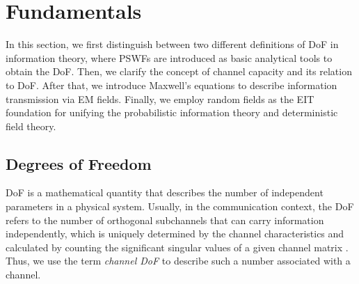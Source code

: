 \documentclass[journal,twocolumn]{IEEEtran}
\begin{document}
\section{Fundamentals}
In this section, we first distinguish between two different definitions of DoF in information theory, where PSWFs are introduced as basic analytical tools to obtain the DoF. 
Then, we clarify the concept of channel capacity and its relation to DoF. 
After that, we introduce Maxwell's equations to describe information transmission via EM fields. 
Finally, we employ random fields as the EIT foundation for unifying the probabilistic information theory and deterministic field theory. 


\subsection{Degrees of Freedom}
\label{Sec_2_Subsec_1}
DoF is a mathematical quantity that describes the number of independent parameters in a physical system. 
Usually, in the communication context, the DoF refers to the number of orthogonal subchannels that can carry information independently, which is uniquely determined by the channel characteristics and calculated by counting the significant singular values of a given channel matrix \cite{goldsmith2003capacity}. 
Thus, we use the term {{\emph{channel DoF}}} to describe such a number associated with a channel.
\end{document}
